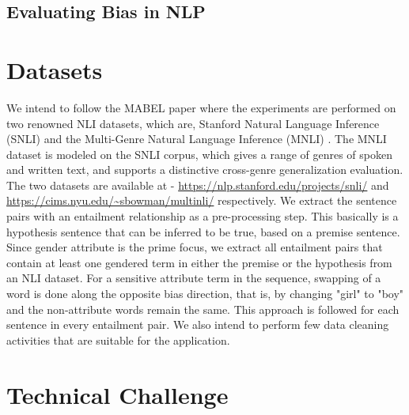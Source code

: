 \documentclass[11pt]{article}
\begin{document}
\subsection{Evaluating Bias in NLP}





\section{Datasets}

We intend to follow the MABEL paper where the experiments are performed on two renowned NLI datasets, which are, Stanford Natural Language Inference (SNLI) \cite{SNLI_dataset_paper} and the Multi-Genre Natural Language Inference (MNLI) \cite{MNLI_dataset_paper}. The MNLI dataset is modeled on the SNLI corpus, which gives a range of genres of spoken and written text, and supports a distinctive cross-genre generalization evaluation. The two datasets are available at - \url{https://nlp.stanford.edu/projects/snli/} and \url{https://cims.nyu.edu/~sbowman/multinli/} respectively.
We extract the sentence pairs with an entailment relationship as a pre-processing step. This basically is a hypothesis sentence that can be inferred to be true, based on a premise sentence. Since gender attribute is the prime focus, we extract all entailment pairs that contain at least one gendered term in either the premise or the hypothesis from an NLI dataset. For a sensitive attribute term in the sequence, swapping of a word is done along the opposite bias direction, that is, by changing "girl" to "boy" and the non-attribute words remain the same. This approach is followed for each sentence in every entailment pair. We also intend to perform few data cleaning activities that are suitable for the application.

\section{Technical Challenge}






\appendix
\end{document}
